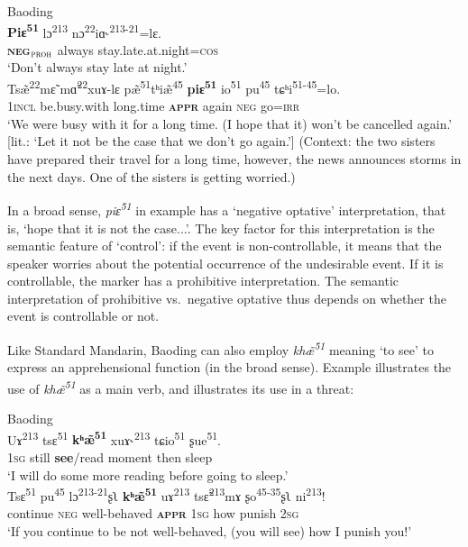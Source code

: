 \documentclass[output=paper,colorlinks,citecolor=brown, language=chinese]{langscibook}
\begin{document}
\ea \label{ex:Song9}  \textnormal{Baoding}\\
\ea \label{ex:Song9a}
\gll \textbf{Piɛ\textsuperscript{51}} lɔ\textsuperscript{213} nɔ\textsuperscript{22}iɑ˞\textsuperscript{213-21}=lɛ. \\
\textbf{\textsc{neg$_{\mathrm{\textsc{proh}}}$}} always stay.late.at.night=\textsc{cos} \\
\glt `Don't always stay late at night.' \\
\ex \label{ex:Song9b}
\gll Tsæ̃\textsuperscript{22}mɛ̃ mɑ̃\textsuperscript{22}xuɤ-lɛ pæ̃\textsuperscript{51}tʰiæ̃\textsuperscript{45} \textbf{piɛ\textsuperscript{51}} io\textsuperscript{51} pu\textsuperscript{45} tɕʰi\textsuperscript{51-45}=lo.  \\
\textsc{1incl} be.busy.with long.time \textsc{\textbf{appr}} again \textsc{neg} go=\textsc{irr} \\
\glt `We were busy with it for a long time. (I hope that it) won't be cancelled again.' [lit.: `Let it not be the case that we don't go again.'] (Context: the two sisters have prepared their travel for a long time, however, the news announces storms in the next days. One of the sisters is getting worried.)
\z
\z

\noindent In a broad sense, \textit{piɛ\textsuperscript{51}} in example  has a `negative optative' interpretation, that is, `hope that it is not the case...'.  The key factor for this interpretation is the semantic feature of `control': if the event is non-controllable, it means that the speaker worries about the potential occurrence of the undesirable event. If it is controllable, the marker has a prohibitive interpretation. The semantic interpretation of prohibitive vs.\ negative optative thus depends on whether the event is controllable or not.

Like Standard Mandarin, Baoding can also employ \textit{khæ̃\textsuperscript{51}} meaning `to see' to express an apprehensional function (in the broad sense). Example  illustrates the use of \textit{khæ̃\textsuperscript{51}} as a main verb, and  illustrates its use in a threat:



\ea \label{ex:Song10}  \textnormal{Baoding}\\
\ea \label{ex:Song10a}
\gll Uɤ\textsuperscript{213} tsɛ\textsuperscript{51} \textbf{kʰæ̃\textsuperscript{51}} xuɤ˞\textsuperscript{213} tɕio\textsuperscript{51} ʂue\textsuperscript{51}. \\
\textsc{1sg} still \textbf{see}/read moment then sleep \\
\glt `I will do some more reading before going to sleep.' \\
\ex \label{ex:Song10b}
\gll  Tsɛ\textsuperscript{51} pu\textsuperscript{45} lɔ\textsuperscript{213-21}ʂʅ \textbf{kʰæ̃\textsuperscript{51}} uɤ\textsuperscript{213} tsɛ̃\textsuperscript{213}mɤ	ʂo\textsuperscript{45-35}ʂʅ ni\textsuperscript{213}! \\
continue \textsc{neg} well-behaved \textsc{\textbf{appr}} \textsc{1sg} how punish \textsc{2sg} \\
\glt `If you continue to be not well-behaved, (you will see) how I punish you!'
\z
\z
\end{document}
